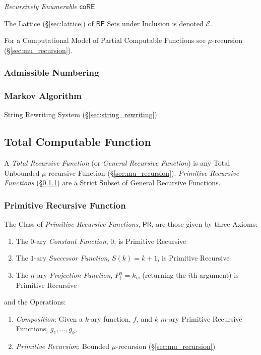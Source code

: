 \emph{Recursively Enumerable} $\mathsf{coRE}$

The Lattice (\S\ref{sec:lattice}) of $\mathsf{RE}$ Sets under
Inclusion is denoted $\mathcal{E}$.

For a Computational Model of Partial Computable Functions see
$\mu$-recursion (\S\ref{sec:mu_recursion}).



\subsubsection{Admissible Numbering}\label{sec:admissible_numbering}

\subsubsection{Markov Algorithm}\label{sec:markov_algorithm}

String Rewriting System (\S\ref{sec:string_rewriting})



\subsection{Total Computable Function}\label{sec:total_computable}

A \emph{Total Recursive Function} (or \emph{General Recursive
  Function}) is any Total Unbounded $\mu$-recursive Function
(\S\ref{sec:mu_recursion}). \emph{Primitive Recursive Functions}
(\S\ref{sec:primitive_recursive}) are a Strict Subset of General
Recursive Functions.



\subsubsection{Primitive Recursive Function}
\label{sec:primitive_recursive}

The Class of \emph{Primitive Recursive Functions}, $\mathsf{PR}$, are
those given by three Axioms:
\begin{enumerate}
  \item The $0$-ary \emph{Constant Function}, $0$, is Primitive
    Recursive
  \item The $1$-ary \emph{Successor Function}, $S(k) = k + 1$, is
    Primitive Recursive
  \item The $n$-ary \emph{Projection Function}, $P_i^n = k_i$,
    (returning the $i$th argument) is Primitive Recursive
\end{enumerate}
and the Operations:
\begin{enumerate}
  \item \emph{Composition}: Given a $k$-ary function, $f$, and $k$
    $m$-ary Primitive Recursive Functions, $g_1, \ldots, g_k$,
  \item \emph{Primitive Recursion}: Bounded $\mu$-recursion
    (\S\ref{sec:mu_recursion})
\end{enumerate}

